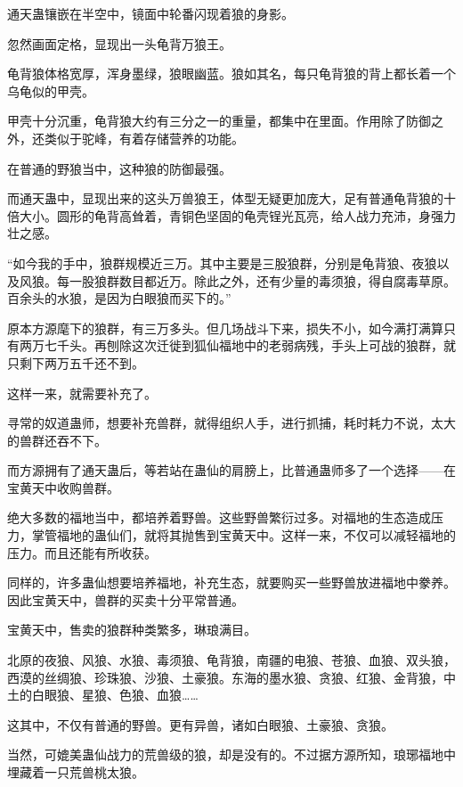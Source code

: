 
\begin{this_body}

通天蛊镶嵌在半空中，镜面中轮番闪现着狼的身影。

忽然画面定格，显现出一头龟背万狼王。

龟背狼体格宽厚，浑身墨绿，狼眼幽蓝。狼如其名，每只龟背狼的背上都长着一个乌龟似的甲壳。

甲壳十分沉重，龟背狼大约有三分之一的重量，都集中在里面。作用除了防御之外，还类似于驼峰，有着存储营养的功能。

在普通的野狼当中，这种狼的防御最强。

而通天蛊中，显现出来的这头万兽狼王，体型无疑更加庞大，足有普通龟背狼的十倍大小。圆形的龟背高耸着，青铜色坚固的龟壳锃光瓦亮，给人战力充沛，身强力壮之感。

“如今我的手中，狼群规模近三万。其中主要是三股狼群，分别是龟背狼、夜狼以及风狼。每一股狼群数目都近万。除此之外，还有少量的毒须狼，得自腐毒草原。百余头的水狼，是因为白眼狼而买下的。”

原本方源麾下的狼群，有三万多头。但几场战斗下来，损失不小，如今满打满算只有两万七千头。再刨除这次迁徙到狐仙福地中的老弱病残，手头上可战的狼群，就只剩下两万五千还不到。

这样一来，就需要补充了。

寻常的奴道蛊师，想要补充兽群，就得组织人手，进行抓捕，耗时耗力不说，太大的兽群还吞不下。

而方源拥有了通天蛊后，等若站在蛊仙的肩膀上，比普通蛊师多了一个选择——在宝黄天中收购兽群。

绝大多数的福地当中，都培养着野兽。这些野兽繁衍过多。对福地的生态造成压力，掌管福地的蛊仙们，就将其抛售到宝黄天中。这样一来，不仅可以减轻福地的压力。而且还能有所收获。

同样的，许多蛊仙想要培养福地，补充生态，就要购买一些野兽放进福地中豢养。因此宝黄天中，兽群的买卖十分平常普通。

宝黄天中，售卖的狼群种类繁多，琳琅满目。

北原的夜狼、风狼、水狼、毒须狼、龟背狼，南疆的电狼、苍狼、血狼、双头狼，西漠的丝绸狼、珍珠狼、沙狼、土豪狼。东海的墨水狼、贪狼、红狼、金背狼，中土的白眼狼、星狼、色狼、血狼……

这其中，不仅有普通的野兽。更有异兽，诸如白眼狼、土豪狼、贪狼。

当然，可媲美蛊仙战力的荒兽级的狼，却是没有的。不过据方源所知，琅琊福地中埋藏着一只荒兽桃太狼。


\end{this_body}
